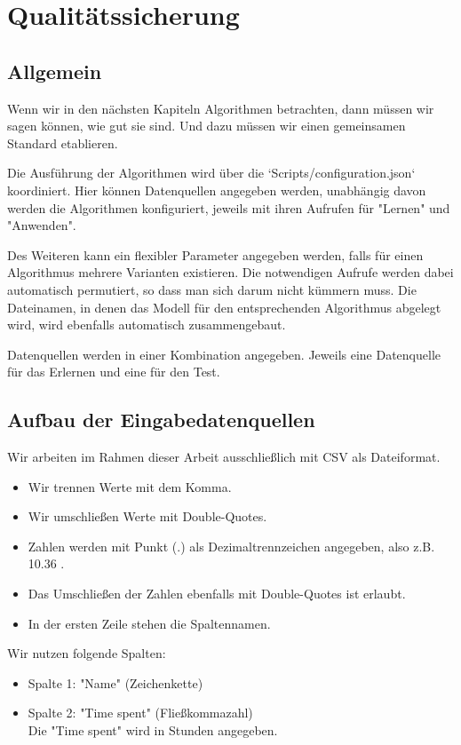 \newpage{}

\section{Qualitätssicherung}

\subsection{Allgemein}

Wenn wir in den nächsten Kapiteln Algorithmen betrachten, dann müssen 
wir sagen können, wie gut sie sind. Und dazu müssen wir einen gemeinsamen Standard etablieren.

Die Ausführung der Algorithmen wird über die `Scripts/configuration.json` 
koordiniert. Hier können Datenquellen angegeben werden, unabhängig davon 
werden die Algorithmen konfiguriert, jeweils mit ihren Aufrufen für "Lernen"
und "Anwenden". 

Des Weiteren kann ein flexibler Parameter angegeben werden, falls für einen Algorithmus mehrere Varianten existieren. Die notwendigen Aufrufe werden dabei automatisch permutiert, so dass man sich darum nicht kümmern muss. Die Dateinamen, in denen das Modell für den entsprechenden Algorithmus abgelegt wird, wird ebenfalls automatisch zusammengebaut.

Datenquellen werden in einer Kombination angegeben. Jeweils eine Datenquelle für das Erlernen und eine für den Test. 

\subsection{Aufbau der Eingabedatenquellen}

Wir arbeiten im Rahmen dieser Arbeit ausschließlich mit CSV als Dateiformat. 

\begin{itemize}
  \item Wir trennen Werte mit dem Komma.
  \item Wir umschließen Werte mit Double-Quotes.
  \item Zahlen werden mit Punkt (.) als Dezimaltrennzeichen angegeben, also z.B. 10.36 .
  \item Das Umschließen der Zahlen ebenfalls mit Double-Quotes ist erlaubt.
  \item In der ersten Zeile stehen die Spaltennamen.
\end{itemize}

Wir nutzen folgende Spalten:
\begin{itemize}
  \item Spalte 1: "Name" (Zeichenkette)
  \item Spalte 2: "Time spent" (Fließkommazahl)\\
        Die "Time spent" wird in Stunden angegeben.   
\end{itemize}

